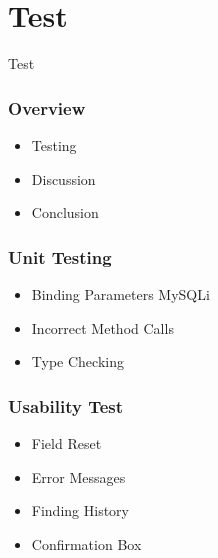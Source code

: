 \section{Test}
\begin{frame}
\begin{center}
\Huge Test
\end{center}
\end{frame}

\begin{frame}
\frametitle{Overview}
\begin{itemize}
	\item Testing
	\item Discussion
	\item Conclusion
\end{itemize}	
\end{frame}

\begin{frame}
\frametitle{Unit Testing}
\begin{itemize}
	\item Binding Parameters MySQLi
	\item Incorrect Method Calls
	\item Type Checking
\end{itemize}
\end{frame}

\begin{frame}
\frametitle{Usability Test}
\begin{itemize}
	\item Field Reset
	\item Error Messages
	\item Finding History
	\item Confirmation Box
\end{itemize}
\end{frame}

